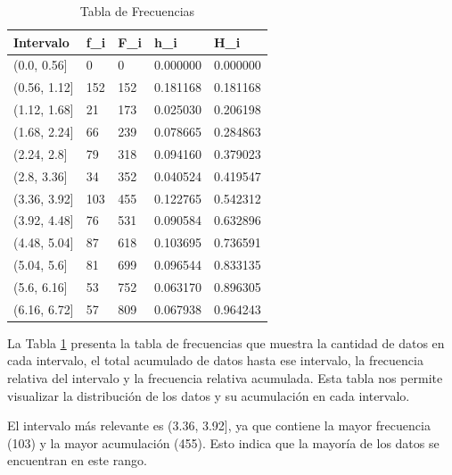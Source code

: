 \begin{table}[H]
    \centering
    \caption{Tabla de Frecuencias}
    \begin{tabular}{lllll}
        \hline
        \textbf{Intervalo} & \textbf{f\_i} & \textbf{F\_i} & \textbf{h\_i} & \textbf{H\_i} \\
        \hline
        (0.0, 0.56]        & 0             & 0             & 0.000000      & 0.000000      \\
        (0.56, 1.12]       & 152           & 152           & 0.181168      & 0.181168      \\
        (1.12, 1.68]       & 21            & 173           & 0.025030      & 0.206198      \\
        (1.68, 2.24]       & 66            & 239           & 0.078665      & 0.284863      \\
        (2.24, 2.8]        & 79            & 318           & 0.094160      & 0.379023      \\
        (2.8, 3.36]        & 34            & 352           & 0.040524      & 0.419547      \\
        (3.36, 3.92]       & 103           & 455           & 0.122765      & 0.542312      \\
        (3.92, 4.48]       & 76            & 531           & 0.090584      & 0.632896      \\
        (4.48, 5.04]       & 87            & 618           & 0.103695      & 0.736591      \\
        (5.04, 5.6]        & 81            & 699           & 0.096544      & 0.833135      \\
        (5.6, 6.16]        & 53            & 752           & 0.063170      & 0.896305      \\
        (6.16, 6.72]       & 57            & 809           & 0.067938      & 0.964243      \\
        \hline
    \end{tabular}%
    \label{tab:tabla_frecuencias}%
\end{table}%

La Tabla \ref{tab:tabla_frecuencias} presenta la tabla de frecuencias que muestra la cantidad de datos en cada intervalo, el total acumulado de datos hasta ese intervalo, la frecuencia relativa del intervalo y la frecuencia relativa acumulada. Esta tabla nos permite visualizar la distribución de los datos y su acumulación en cada intervalo.

El intervalo más relevante es (3.36, 3.92], ya que contiene la mayor frecuencia (103) y la mayor acumulación (455). Esto indica que la mayoría de los datos se encuentran en este rango.


